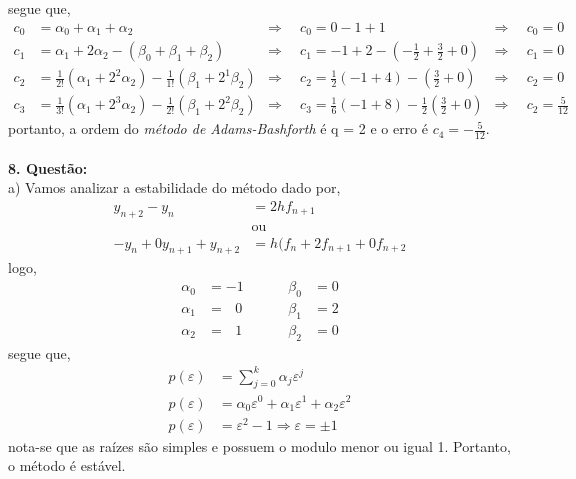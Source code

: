 \documentclass[a4paper,12pt]{article}
\begin{document}
segue que,
	\begin{align*}
		c_{0} &= \alpha_{0} + \alpha_{1} + \alpha_{2} &\Rightarrow \hspace{6pt} &c_{0} = 0 -1 + 1 &\Rightarrow
		\hspace{2pt} &c_{0} =
		0\\
		c_{1} &= \alpha_{1} + 2\alpha_{2} -(\beta_{0} + \beta_{1} + \beta_{2}) &\Rightarrow \hspace{6pt} &c_{1} = -1 +
		2 - (-\frac{1}{2} + \frac{3}{2} + 0) &\Rightarrow \hspace{2pt} &c_{1} = 0\\
		c_{2} &= \frac{1}{2!}(\alpha_{1} + 2^{2}\alpha_{2}) - \frac{1}{1!}(\beta_{1} + 2^{1}\beta_{2}) &\Rightarrow
		\hspace{6pt} &c_{2} = \frac{1}{2}(-1 + 4)-(\frac{3}{2} + 0) &\Rightarrow \hspace{6pt} &c_{2} = 0 \\
		c_{3} &= \frac{1}{3!}(\alpha_{1} + 2^{3}\alpha_{2}) - \frac{1}{2!}(\beta_{1} + 2^{2}\beta_{2}) &\Rightarrow
		\hspace{6pt} &c_{3} = \frac{1}{6}(-1 + 8)- \frac{1}{2}(\frac{3}{2} + 0) &\Rightarrow \hspace{6pt} &c_{2} =
		\frac{5}{12}
	\end{align*}
portanto, a ordem do \textit{m\'etodo de Adams-Bashforth} \'e q = 2 e o erro \'e $c_{4} = -\frac{5}{12}.$
\\ \\
\textbf{8. Quest\~ao:}\\
a) Vamos analizar a estabilidade do m\'etodo dado por,
	\begin{align*}
		y_{n+2} - y_{n} &= 2hf_{n+1} \\
		&\mbox{ou}\\
		-y_{n} + 0y_{n+1} + y_{n+2} &= h(f_{n} + 2f_{n+1} + 0f_{n+2}
	\end{align*}
logo,
	\begin{align*}
		\alpha_{0} &= -1 \hspace{1cm}& \beta_{0} &= 0\\
		\alpha_{1} &=\hspace{8pt} 0 \hspace{1cm}& \beta_{1} &= 2\\
		\alpha_{2} &=\hspace{8pt} 1 \hspace{1cm}& \beta_{2} &= 0
	\end{align*}
segue que,
	\begin{align*}
		p(\varepsilon) &= \sum_{j=0}^{k}\alpha_{j}\varepsilon^{j} \\
		p(\varepsilon) &= \alpha_{0}\varepsilon^{0} + \alpha_{1}\varepsilon^{1} + \alpha_{2}\varepsilon^{2}\\
		p(\varepsilon) &= \varepsilon^{2} -1 \Rightarrow \varepsilon = \pm 1 
	\end{align*}
nota-se que as ra\'izes s\~ao simples e possuem o modulo menor ou igual 1. Portanto, o m\'etodo \'e est\'avel.
\end{document}
